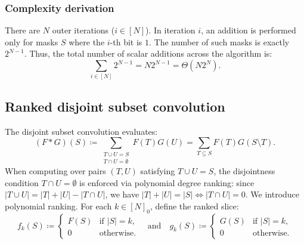 \documentclass[11pt, letterpaper]{article}
\begin{document}
\subsubsection*{Complexity derivation}
There are $N$ outer iterations ($i \in [N]$). In iteration $i$, an addition is performed only for masks $S$ where the $i$-th bit is $1$. The number of such masks is exactly $2^{N-1}$. Thus, the total number of scalar additions across the algorithm is:
\begin{equation}
    \sum_{i \in [N]} 2^{N-1} = N 2^{N-1} = \Theta(N 2^N).
\end{equation}

\subsection{Ranked disjoint subset convolution}
The disjoint subset convolution evaluates:
\begin{equation}
    (F * G)(S) \coloneqq \sum_{\substack{T \cup U = S \\ T \cap U = \emptyset}} F(T) G(U) = \sum_{T \subseteq S} F(T) G(S \setminus T).
\end{equation}
When computing over pairs $(T, U)$ satisfying $T \cup U = S$, the disjointness condition $T \cap U = \emptyset$ is enforced via polynomial degree ranking: since $|T \cup U| = |T| + |U| - |T \cap U|$, we have $|T| + |U| = |S| \iff |T \cap U| = 0$.
We introduce polynomial ranking. For each $k \in [N]_0$, define the ranked slice:
\begin{equation}
    f_k(S) \coloneqq \begin{cases} F(S) & \text{if } |S| = k, \\ 0 & \text{otherwise.} \end{cases}
    \quad \text{and} \quad
    g_k(S) \coloneqq \begin{cases} G(S) & \text{if } |S| = k, \\ 0 & \text{otherwise.} \end{cases}
\end{equation}
\end{document}
